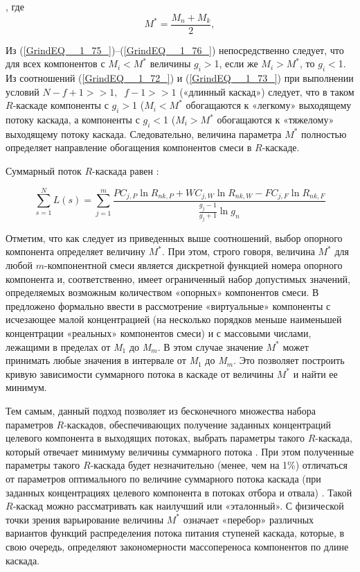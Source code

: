 , где 
\begin{equation} \label{EQ_Mstar} 
  M^{*} =\frac{M_{n} +M_{k} }{2},        
\end{equation} 

Из (\ref{GrindEQ__1_75_})--(\ref{GrindEQ__1_76_}) непосредственно следует, что для всех компонентов с $M_{i} $$\mathrm{<}$$M^{*} $ величины $g_{i} $$\mathrm{>}$1, если же $M_{i} $$\mathrm{>}$$M^{*} $, то $g_{i} $$\mathrm{<}$1. Из соотношений (\ref{GrindEQ__1_72_}) и (\ref{GrindEQ__1_73_}) при выполнении условий $N-f+1>>1,\; \; f-1>>1$ («длинный каскад») следует, что в таком $R$-каскаде компоненты с $g_{i} $$\mathrm{>}$1 ($M_{i} $$\mathrm{<}$$M^{*} $ обогащаются к «легкому» выходящему потоку каскада, а компоненты с $g_{i} $$\mathrm{<}$1 ($M_{i} $$\mathrm{>}$$M^{*}$ обогащаются к «тяжелому» выходящему потоку каскада. Следовательно, величина параметра $M^{*}$ полностью определяет направление обогащения компонентов смеси в $R$-каскаде. 

Суммарный поток $R$-каскада равен \cite{sulaberidzeTeoriyaKaskadovDlya2011}:

\begin{equation} \label{GrindEQ__1_77_} 
  \sum _{s=1}^{N}L(s) =\sum _{j=1}^{m}\frac{PC_{j,P} \ln R_{nk,P} +WC_{j,W} \ln R_{nk,W} -FC_{j,F} \ln R_{nk,F} }{\frac{g_{j} -1}{g_{j} +1} \ln g_{n} }              
\end{equation} 

Отметим, что как следует из приведенных выше соотношений, выбор опорного компонента определяет величину $M^{*}$. При этом, строго говоря, величина $M^{*}$ для любой $m$-компонентной смеси является дискретной функцией номера опорного компонента и, соответственно, имеет ограниченный набор допустимых значений, определяемых возможным количеством «опорных» компонентов смеси. В \cite{sulaberidzeSravnenieOptimalnyhModelnyh2008} предложено формально ввести в рассмотрение «виртуальные» компоненты с исчезающее малой концентрацией (на несколько порядков меньше наименьшей концентрации «реальных» компонентов смеси) и с массовыми числами, лежащими в пределах от \textit{M${}_{1}$} до \textit{M${}_{m}$}. В этом случае значение $M^{*}$ может принимать любые значения в интервале от \textit{M${}_{1}$} до \textit{M${}_{m}$}. Это позволяет построить кривую зависимости суммарного потока в каскаде от величины $M^{*}$ и найти ее минимум.

Тем самым, данный подход позволяет из бесконечного множества набора параметров $R$-каскадов, обеспечивающих получение заданных концентраций целевого компонента в выходящих потоках, выбрать параметры такого $R$-каскада, который отвечает минимуму величины суммарного потока \cite{sulaberidzeSravnenieOptimalnyhModelnyh2008}. При этом полученные параметры такого $R$-каскада будет незначительно (менее, чем на 1\%) отличаться от параметров оптимального по величине суммарного потока каскада (при заданных концентрациях целевого компонента в потоках отбора и отвала) \cite{songComparativeStudyModel2010}. Такой $R$-каскад можно рассматривать как наилучший или «эталонный». С физической точки зрения варьирование величины $M^{*}$ означает «перебор» различных вариантов функций распределения потока питания ступеней каскада, которые, в свою очередь, определяют закономерности массопереноса компонентов по длине каскада.

